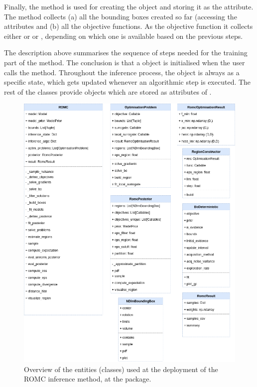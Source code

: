 Finally, the  method is used for creating
the  object and storing it as the
 attribute. The method collects (a) all the
bounding boxes created so far (accessing the
 attributes and (b) all the objective functions. As the objective function it collects either  or \linebreak {} or , depending on which one is available based on the previous steps.

The description above summarises the sequence of steps needed for the
training part of the method. The conclusion is that a 
object is initialised when the user calls the method. Throughout the
inference process, the  object is always as a specific state,
which gets updated whenever an algorithmic step is executed. The rest
of the classes provide objects which are stored as attributes of
.

\begin{figure}[ht]
    \begin{center}
      \includegraphics[width=\textwidth]{./latex_files/graphs/RomcEntityDiagram.png}
    \end{center}
  \caption[Overview of the entities (classes) of the ROMC implementation.]{Overview of the entities (classes) used at the deployment of the ROMC inference method, at the  package.}
  \label{fig:example_training}
\end{figure}


